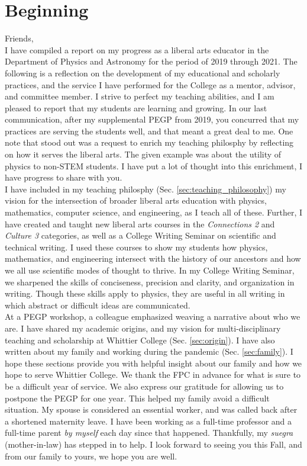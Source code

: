 \documentclass[../../main.tex]{subfiles}
\begin{document}
\section{Beginning}

Friends,
\\
\vspace{0.25cm}
I have compiled a report on my progress as a liberal arts educator in the Department of Physics and Astronomy for the period of 2019 through 2021.  The following is a reflection on the development of my educational and scholarly practices, and the service I have performed for the College as a mentor, advisor, and committee member.  I strive to perfect my teaching abilities, and I am pleased to report that my students are learning and growing.  In our last communication, after my supplemental PEGP from 2019, you concurred that my practices are serving the students well, and that meant a great deal to me.  One note that stood out was a request to enrich my teaching philosphy by reflecting on how it serves the liberal arts.  The given example was about the utility of physics to non-STEM students.  I have put a lot of thought into this enrichment, I have progress to share with you.
\\
\vspace{0.25cm}
I have included in my teaching philosphy (Sec. \ref{sec:teaching_philosophy}) my vision for the intersection of broader liberal arts education with physics, mathematics, computer science, and engineering, as I teach all of these.  Further, I have created and taught new liberal arts courses in the \textit{Connections 2} and \textit{Culture 3} categories, as well as a College Writing Seminar on scientific and technical writing.  I used these courses to show my students how physics, mathematics, and engineering intersect with the history of our ancestors and how we all use scientific modes of thought to thrive.  In my College Writing Seminar, we sharpened the skills of conciseness, precision and clarity, and organization in writing.  Though these skills apply to physics, they are useful in all writing in which abstract or difficult ideas are communicated.
\\
\vspace{0.25cm}
At a PEGP workshop, a colleague emphasized weaving a narrative about who we are.  I have shared my academic origins, and my vision for multi-disciplinary teaching and scholarship at Whittier College (Sec. \ref{sec:origin}).  I have also written about my family and working during the pandemic (Sec. \ref{sec:family}).  I hope these sections provide you with helpful insight about our family and how we hope to serve Whittier College.  We thank the FPC in advance for what is sure to be a difficult year of service.  We also express our gratitude for allowing us to postpone the PEGP for one year.  This helped my family avoid a difficult situation.  My spouse is considered an essential worker, and was called back after a shortened maternity leave.  I have been working as a full-time professor and a full-time parent \textit{by myself} each day since that happened.  Thankfully, my \textit{suegra} (mother-in-law) has stepped in to help.  I look forward to seeing you this Fall, and from our family to yours, we hope you are well.
\end{document}
